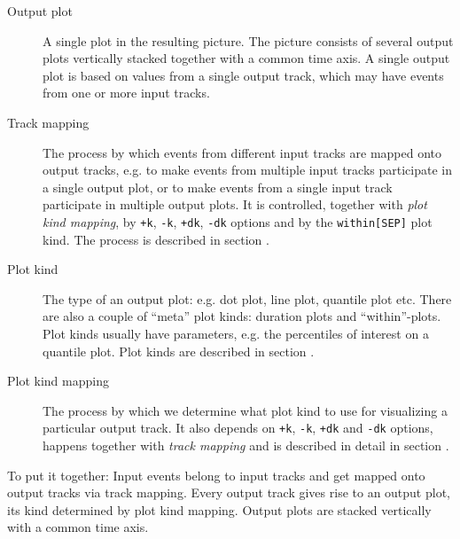 \documentclass{article}
\begin{document}
\begin{description}
\item[Output plot] A single plot in the resulting picture. The picture consists of several output plots vertically stacked together with a common time axis. A single output plot is based on values from a single output track, which may have events from one or more input tracks.
\item[Track mapping] The process by which events from different input tracks are mapped onto output tracks, e.g. to make events from multiple input tracks participate in a single output plot, or to make events from a single input track participate in multiple output plots. It is controlled, together with \emph{plot kind mapping}, by \verb|+k|, \verb|-k|, \verb|+dk|, \verb|-dk| options and by the \verb|within[SEP]| plot kind. The process is described in section .
\item[Plot kind] The type of an output plot: e.g. dot plot, line plot, quantile plot etc. There are also a couple of ``meta'' plot kinds: duration plots and ``within''-plots. Plot kinds usually have parameters, e.g. the percentiles of interest on a quantile plot. Plot kinds are described in section .
\item[Plot kind mapping] The process by which we determine what plot kind to use for visualizing a particular output track. It also depends on \verb|+k|, \verb|-k|, \verb|+dk| and \verb|-dk| options, happens together with \emph{track mapping} and is described in detail in section .
\end{description}

To put it together: Input events belong to input tracks and get mapped onto output tracks via track mapping. Every output track gives rise to an output plot, its kind determined by plot kind mapping. Output plots are stacked vertically with a common time axis.
\end{document}
